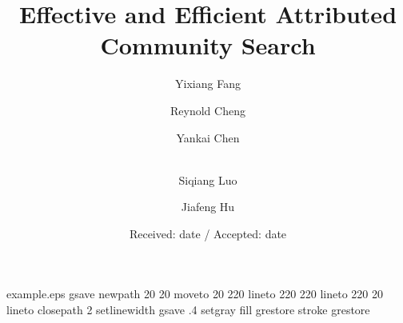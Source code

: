 \begin{filecontents*}{example.eps}
gsave
newpath
  20 20 moveto
  20 220 lineto
  220 220 lineto
  220 20 lineto
closepath
2 setlinewidth
gsave
  .4 setgray fill
grestore
stroke
grestore
\end{filecontents*}
%
\RequirePackage{fix-cm}
%
\documentclass[twocolumn]{svjour3}          %
%
\smartqed  %
%

\let\proof\relax
\let\endproof\relax

\usepackage{graphicx}
\usepackage{balance}

\usepackage{color}
\usepackage[noend]{algpseudocode}
\usepackage{algorithm}
\usepackage{varwidth}
\usepackage{url}
\usepackage{multirow}
\usepackage{subfigure}
\usepackage{mathtools}
\usepackage{amsmath,bm}
\usepackage{hyperref}
\usepackage{amsthm}
\usepackage{indentfirst}

\renewcommand{\arraystretch}{1.18}
\newtheorem{variant}{Variant}
\newcommand{\fang}[1]{{\color{red}[\textbf{Yixiang:} #1]}}
\newcommand{\rey}[1]{{\color{blue}[\textbf{Reynold:} #1]}}
\newcommand{\luo}[1]{{\color{purple}[\textbf{Siqiang:} #1]}}
\newcommand{\hu}[1]{{\color{green}[\textbf{Jiafeng:} #1]}}
\newcommand{\chen}[1]{{\color{blue}[\textbf{Yankai:} #1]}}
\newcommand{\tabincell}[2]{\begin{tabular}{@{}#1@{}}#2\end{tabular}}





\title{Effective and Efficient Attributed Community Search}

\author{Yixiang Fang         \and
        Reynold Cheng        \and
        Yankai Chen          \and \\
        Siqiang Luo          \and
        Jiafeng Hu
}


\date{Received: date / Accepted: date}


